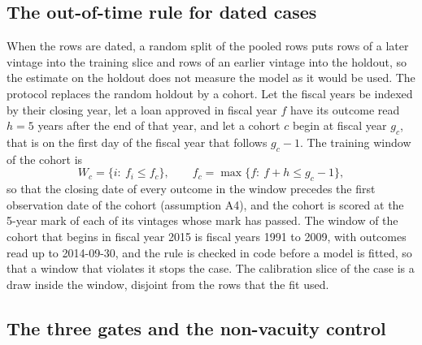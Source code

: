 

\subsection{The out-of-time rule for dated cases}

When the rows are dated, a random split of the pooled rows puts rows of a later vintage into the training slice and rows of an earlier vintage into the holdout, so the estimate on the holdout does not measure the model as it would be used. The protocol replaces the random holdout by a cohort. Let the fiscal years be indexed by their closing year, let a loan approved in fiscal year $f$ have its outcome read $h=5$ years after the end of that year, and let a cohort $c$ begin at fiscal year $g_c$, that is on the first day of the fiscal year that follows $g_c-1$. The training window of the cohort is
\begin{equation}
W_c=\{i:\ f_i\le f_c\},\qquad f_c=\max\{f:\ f+h\le g_c-1\},
\label{eq:window}
\end{equation}
so that the closing date of every outcome in the window precedes the first observation date of the cohort (assumption A4), and the cohort is scored at the 5-year mark of each of its vintages whose mark has passed. The window of the cohort that begins in fiscal year 2015 is fiscal years 1991 to 2009, with outcomes read up to 2014-09-30, and the rule is checked in code before a model is fitted, so that a window that violates it stops the case. The calibration slice of the case is a draw inside the window, disjoint from the rows that the fit used.

\subsection{The three gates and the non-vacuity control}

